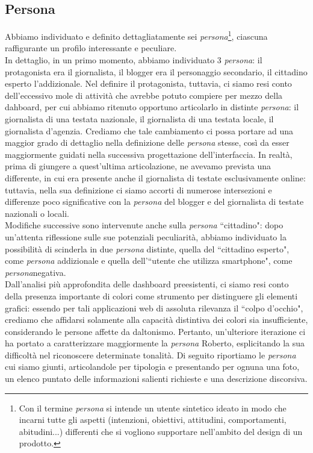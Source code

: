 \subsection{Persona}
Abbiamo individuato e definito dettagliatamente sei \textit{persona}\footnote{Con il termine \textit{persona} si intende un utente sintetico ideato in modo che incarni tutte gli aspetti (intenzioni, obiettivi, attitudini, comportamenti, abitudini...) differenti che si vogliono supportare nell'ambito del design di un prodotto.}, ciascuna raffigurante un profilo interessante e peculiare.\\
In dettaglio, in un primo momento, abbiamo individuato 3 \textit{persona}: il protagonista era il giornalista, il blogger era il personaggio secondario, il cittadino esperto l'addizionale. Nel definire il protagonista, tuttavia, ci siamo resi conto dell'eccessivo mole di attività che avrebbe potuto compiere per mezzo della dahboard, per cui abbiamo ritenuto opportuno articolarlo in distinte \textit{persona}: il giornalista di una testata nazionale, il giornalista di una testata locale, il giornalista d'agenzia. Crediamo che tale cambiamento ci possa portare ad una maggior grado di dettaglio nella definizione delle \textit{persona} stesse, così da esser maggiormente guidati nella successiva progettazione dell'interfaccia.
\noindent
In realtà, prima di giungere a quest'ultima articolazione, ne avevamo prevista una differente, in cui era presente anche il giornalista di testate esclusivamente online: tuttavia, nella sua definizione ci siamo accorti di numerose intersezioni e differenze poco significative con la \textit{persona} del blogger e del giornalista di testate nazionali o locali. \\ 
Modifiche successive sono intervenute anche sulla \textit{persona} ``cittadino": dopo un'attenta riflessione sulle sue potenziali peculiarità, abbiamo individuato la possibilità di scinderla in due \textit{persona} distinte, quella del ``cittadino esperto", come \textit{persona} addizionale e quella dell'``utente che utilizza smartphone", come \textit{persona}negativa.\\
Dall'analisi più approfondita delle dashboard preesistenti, ci siamo resi conto della presenza importante di colori come strumento per distinguere gli elementi grafici: essendo per tali applicazioni web di assoluta rilevanza il ``colpo d'occhio", crediamo che affidarsi solamente alla capacità distintiva dei colori sia insufficiente, considerando le persone affette da daltonismo. Pertanto, un'ulteriore iterazione ci ha portato a caratterizzare maggiormente la \textit{persona} Roberto, esplicitando la sua difficoltà nel riconoscere determinate tonalità.
\noindent
Di seguito riportiamo le \textit{persona} cui siamo giunti, articolandole per tipologia e presentando per ognuna una foto, un elenco puntato delle informazioni salienti richieste e una descrizione discorsiva.
\newpage
